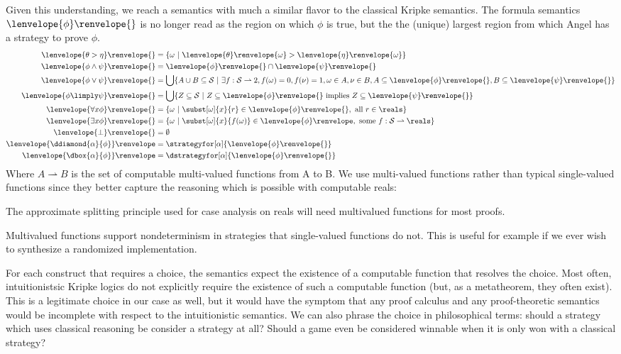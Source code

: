 \documentclass[12pt]{cmuthesis}
\theoremstyle{definition}
\theoremstyle{remark}
\newcommand{\allstate}{\mathcal{S}}
\newcommand{\om}{\omega}
\newcommand{\tint}[2]{\lenvelope{#1}\renvelope{#2}}
\newcommand{\fint}[1]{\lenvelope{#1}\renvelope}
\begin{document}
Given this understanding, we reach a semantics with much a similar flavor to the classical Kripke semantics.
The formula semantics $\fint{\phi}{}$ is no longer read as the region on which $\phi$ is true, but the the (unique) largest region from which Angel has a strategy to prove $\phi$.
\newcommand{\mto}{\rightharpoonup}
\begin{align*}
  \fint{\theta > \eta}{}         &= \{\om~|~\tint{\theta}{\om} > \tint{\eta}{\om}\}\\
  \fint{\phi \land \psi}{}       &= \fint{\phi}{} \cap \fint{\psi}{}\\
  \fint{\phi \lor \psi}{}        &= \bigcup\{A \cup B \subseteq \allstate~|~\exists f:\allstate\mto 2, f(\om)=0, f(\nu)=1, \om\in A, \nu \in B, A \subseteq \fint{\phi}{}, B \subseteq\fint{\psi}{}\}\\
  \fint{\phi \limply \psi}{}     &= \bigcup\{Z \subseteq \allstate ~|~ Z\subseteq\fint{\phi}{}\text{ implies }Z\subseteq\fint{\psi}{}\}\\
  \fint{\forall{x}{\phi}}{}      &= \{\om~|~\subst[\om]{x}{r}\in\fint{\phi}{}, \text{ all }r\in\reals\}\\
  \fint{\exists{x}{\phi}}{}      &= \{\om~|~\subst[\om]{x}{f(\om)}\in\fint{\phi},\text{ some }f:\allstate\mto \reals\}\\
  \fint{\bot}{}                  &= \emptyset  \\
  \fint{\ddiamond{\alpha}{\phi}} &= \strategyfor[\alpha]{\fint{\phi}{}}\\
  \fint{\dbox{\alpha}{\phi}}     &= \dstrategyfor[\alpha]{\fint{\phi}{}}
\end{align*}
Where $A \mto B$ is the set of computable multi-valued functions from A to B.
We use multi-valued functions rather than typical single-valued functions since they better capture the reasoning which is possible with computable reals:
\begin{inparaenum}
\item The approximate splitting principle used for case analysis on reals will need multivalued functions for most proofs.
\item Multivalued functions support nondeterminism in strategies that single-valued functions do not.
This is useful for example if we ever wish to synthesize a randomized implementation.
\end{inparaenum}

For each construct that requires a choice, the semantics expect the existence of a computable function that resolves the choice.
Most often, intuitionistsic Kripke logics do not explicitly require the existence of such a computable function (but, as a metatheorem, they often exist).
This is a legitimate choice in our case as well, but it would have the symptom that any proof calculus and any proof-theoretic semantics would be incomplete with respect to the intuitionistic semantics.
We can also phrase the choice in philosophical terms: should a strategy which uses classical reasoning be consider a strategy at all?
Should a game even be considered winnable when it is only won with a classical strategy?
\end{document}
